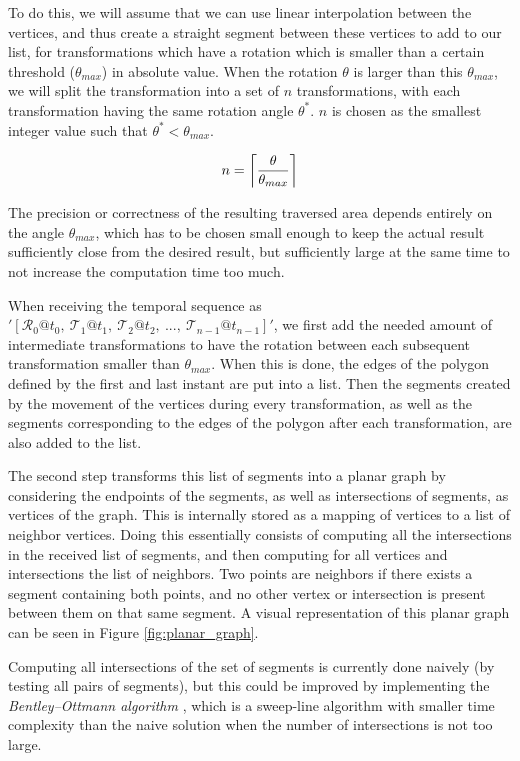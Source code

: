 To do this, we will assume that we can use linear interpolation between the vertices, and thus create a straight segment between these vertices to add to our list, for transformations which have a rotation which is smaller than a certain threshold ($\theta_{max}$) in absolute value. When the rotation $\theta$ is larger than this $\theta_{max}$, we will split the transformation into a set of $n$ transformations, with each transformation having the same rotation angle $\theta^*$. $n$ is chosen as the smallest integer value such that $\theta^* < \theta_{max}$.

\[
    n = \ceil*{\frac{\theta}{\theta_{max}}}
\]

The precision or correctness of the resulting traversed area depends entirely on the angle $\theta_{max}$, which has to be chosen small enough to keep the actual result sufficiently close from the desired result, but sufficiently large at the same time to not increase the computation time too much.

When receiving the temporal sequence as $'[\mathcal{R}_0@t_0,\ \mathcal{T}_1@t_1,\ \mathcal{T}_2@t_2,\ ...,\ \mathcal{T}_{n-1}@t_{n-1}]'$, we first add the needed amount of intermediate transformations to have the rotation between each subsequent transformation smaller than $\theta_{max}$. When this is done, the edges of the polygon defined by the first and last instant are put into a list. Then the segments created by the movement of the vertices during every transformation, as well as the segments corresponding to the edges of the polygon after each transformation, are also added to the list.

The second step transforms this list of segments into a planar graph by considering the endpoints of the segments, as well as intersections of segments, as vertices of the graph. This is internally stored as a mapping of vertices to a list of neighbor vertices. Doing this essentially consists of computing all the intersections in the received list of segments, and then computing for all vertices and intersections the list of neighbors. Two points are neighbors if there exists a segment containing both points, and no other vertex or intersection is present between them on that same segment. A visual representation of this planar graph can be seen in Figure \ref{fig:planar_graph}.

Computing all intersections of the set of segments is currently done naively (by testing all pairs of segments), but this could be improved by implementing the \textit{Bentley–Ottmann algorithm} \cite{computational_geometry}, which is a sweep-line algorithm with smaller time complexity than the naive solution when the number of intersections is not too large.

